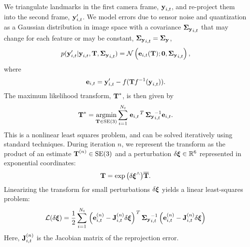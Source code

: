 We triangulate landmarks in the first camera frame, $\boldsymbol{\mathbf{y}}_{i,t}$, and re-project
them into the second frame, $\boldsymbol{\mathbf{y}}_{i,t}'$. We model errors due to sensor noise
and quantization as a Gaussian distribution in image space with a covariance
$\boldsymbol{\mathbf{\Sigma_y}}_{i,t}$ that may change for each feature or may be constant, $\boldsymbol{\mathbf{\Sigma_y}}_{i,t} = \boldsymbol{\mathbf{\Sigma_y}}$,
\begin{equation}
  p(\boldsymbol{\mathbf{y}}_{i,t}' \vert \boldsymbol{\mathbf{y}}_{i,t}, \boldsymbol{\mathbf{T}},
  \boldsymbol{\mathbf{\Sigma_y}}_{i,t})
  =\mathcal{N}\left(\boldsymbol{\mathbf{e}}_{i,t}(\boldsymbol{\mathbf{T}}); \boldsymbol{\mathbf{0}}, \boldsymbol{\mathbf{\Sigma_y}}_{i,t}\right), 
\end{equation}
where
\begin{equation}
 \boldsymbol{\mathbf{e}}_{i,t} = \boldsymbol{\mathbf{y}}_{i,t}' - f( \boldsymbol{\mathbf{T}} 
    f^{-1}( \boldsymbol{\mathbf{y}}_{i,t} ) ).	
   \label{eq:image_error}
\end{equation}
  The maximum likelihood transform,
$\boldsymbol{\mathbf{T}}^*$, is then given by 
\begin{equation}
  \boldsymbol{\mathbf{T}}^* = \operatorname*{argmin}_{\boldsymbol{\mathbf{T}}\in\text{SE}(3)}\sum_{i=1}^{N_t} 
  \left.{\boldsymbol{\mathbf{e}}_{i,t}}\right.^T \boldsymbol{\mathbf{\Sigma_y}}_{i,t}^{-1} \boldsymbol{\mathbf{e}}_{i,t}.
\end{equation}
This is a nonlinear least squares problem, and can be solved iteratively using
standard techniques. During iteration $n$, we represent the transform as the
product of an estimate $\boldsymbol{\mathbf{T}}^{(n)}\in\text{SE}(3)$ and a perturbation
$\delta\Vector{\xi}\in\RealNumbers[6]$ represented in exponential
coordinates:
\begin{equation}
  \boldsymbol{\mathbf{T}} = \exp{\left( \delta \boldsymbol{\mathbf{\xi}} ^{\wedge}
  \right)} \overline{\boldsymbol{\mathbf{T}}}.
\end{equation}
Linearizing the transform for small perturbations $\delta\boldsymbol{\mathbf{\xi}}$
yields a linear least-squares problem:
\begin{equation}
\label{eq:vo_linleastsquares}
  \mathcal{L}(\delta \boldsymbol{\mathbf{\xi}}) = \frac{1}{2}\sum_{i=1}^{N_t} 
  \left.{\left(\boldsymbol{\mathbf{e}}_{i,t}^{(n)}
  - \boldsymbol{\mathbf{J}}_{i,t}^{(n)} \delta\boldsymbol{\mathbf{\xi}}\right)}\right.^T
\boldsymbol{\mathbf{\Sigma_y}}_{i,t}^{-1}
 \left(\boldsymbol{\mathbf{e}}_{i,t}^{(n)}
 - \boldsymbol{\mathbf{J}}_{i,t}^{(n)} \delta\boldsymbol{\mathbf{\xi}}\right)
  \end{equation}
Here, $\boldsymbol{\mathbf{J}}_{i,t}^{(n)}$ is the Jacobian matrix of the reprojection error. 

